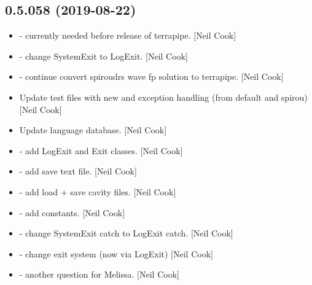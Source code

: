 \documentclass[a4paper,10pt,english]{report}
\begin{document}
\subsection{0.5.058 (2019-08-22)}
\label{\detokenize{misc/changelog:id84}}\begin{itemize}
\item {} 
 - currently needed before release of terrapipe. {[}Neil
Cook{]}

\item {} 
 - change SystemExit to LogExit.
{[}Neil Cook{]}

\item {} 
 - continue convert spiroudrs wave fp solution to
terrapipe. {[}Neil Cook{]}

\item {} 
Update test files with new  and exception handling (from
default and spirou) {[}Neil Cook{]}

\item {} 
Update language database. {[}Neil Cook{]}

\item {} 
 - add LogExit and Exit classes. {[}Neil Cook{]}

\item {} 
 - add save text file. {[}Neil Cook{]}

\item {} 
 - add load + save cavity files. {[}Neil Cook{]}

\item {} 
 - add  constants. {[}Neil Cook{]}

\item {} 
 - change SystemExit catch to LogExit catch.
{[}Neil Cook{]}

\item {} 
 - change exit system (now via LogExit) {[}Neil
Cook{]}

\item {} 
 - another question for Melissa. {[}Neil Cook{]}

\end{itemize}
\end{document}
